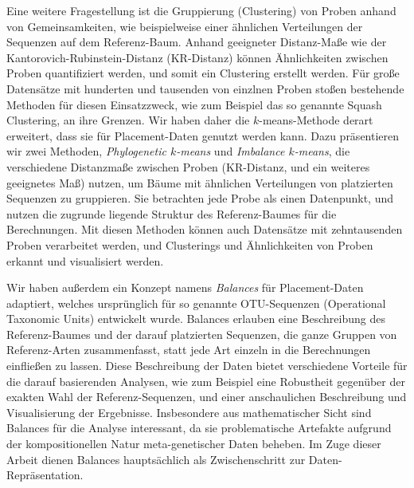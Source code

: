 Eine weitere Fragestellung ist die Gruppierung (Clustering) von Proben anhand von Gemeinsamkeiten,
wie beispielweise einer \"ahnlichen Verteilungen der Sequenzen auf dem Referenz-Baum.
Anhand geeigneter Distanz-Ma\ss{}e wie der Kantorovich-Rubinstein-Distanz (KR-Distanz)
k\"onnen \"Ahnlichkeiten zwischen Proben quantifiziert werden, und somit ein Clustering erstellt werden.
F\"ur gro\ss{}e Datens\"atze mit hunderten und tausenden von einzlnen Proben sto\ss{}en bestehende Methoden
f\"ur diesen Einsatzzweck, wie zum Beispiel das so genannte Squash Clustering, an ihre Grenzen.
Wir haben daher die $k$-means-Methode derart erweitert, dass sie f\"ur Placement-Daten genutzt werden kann.
Dazu pr\"asentieren wir zwei Methoden, \emph{Phylogenetic $k$-means} und \emph{Imbalance $k$-means},
die verschiedene Distanzma\ss{}e zwischen Proben (KR-Distanz, und ein weiteres geeignetes Ma\ss{}) nutzen,
um B\"aume mit \"ahnlichen Verteilungen von platzierten Sequenzen zu gruppieren.
Sie betrachten jede Probe als einen Datenpunkt,
und nutzen die zugrunde liegende Struktur des Referenz-Baumes f\"ur die Berechnungen.
Mit diesen Methoden k\"onnen auch Datens\"atze mit zehntausenden Proben verarbeitet werden,
und Clusterings und \"Ahnlichkeiten von Proben erkannt und visualisiert werden.

Wir haben au\ss{}erdem ein Konzept namens \emph{Balances} f\"ur Placement-Daten adaptiert,
welches urspr\"unglich f\"ur so genannte OTU-Sequenzen (Operational Taxonomic Units) entwickelt wurde.
Balances erlauben eine Beschreibung des Referenz-Baumes und der darauf platzierten Sequenzen,
die ganze Gruppen von Referenz-Arten zusammenfasst,
statt jede Art einzeln in die Berechnungen einflie\ss{}en zu lassen.
Diese Beschreibung der Daten bietet verschiedene Vorteile f\"ur die darauf basierenden Analysen,
wie zum Beispiel eine Robustheit gegen\"uber der exakten Wahl der Referenz-Sequenzen,
und einer anschaulichen Beschreibung und Visualisierung der Ergebnisse.
Insbesondere aus mathematischer Sicht sind Balances f\"ur die Analyse interessant,
da sie problematische Artefakte aufgrund der kompositionellen Natur meta-genetischer Daten beheben.
Im Zuge dieser Arbeit dienen Balances haupts\"achlich als Zwischenschritt zur Daten-Repr\"asentation.


